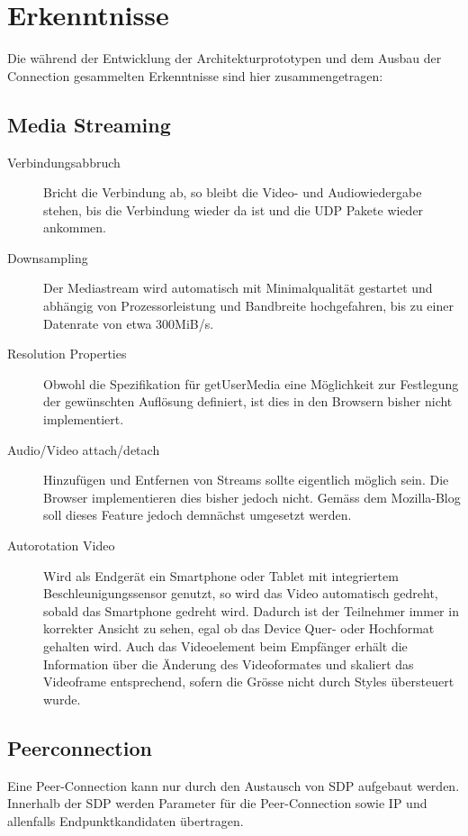 \chapter{Erkenntnisse}
	Die während der Entwicklung der Architekturprototypen und dem Ausbau der Connection gesammelten Erkenntnisse sind hier zusammengetragen:

	\section{Media Streaming}
		\begin{description}
			\item[Verbindungsabbruch] Bricht die Verbindung ab, so bleibt die Video- und Audiowiedergabe stehen, bis die Verbindung wieder da ist und die UDP Pakete wieder ankommen.
		
			\item[Downsampling] Der Mediastream wird automatisch mit Minimalqualität gestartet und abhängig
	 		von Prozessorleistung und Bandbreite hochgefahren, bis zu einer Datenrate von etwa 300MiB/s.
	 		
	 		\item[Resolution Properties] Obwohl die Spezifikation für getUserMedia eine Möglichkeit zur Festlegung der gewünschten Auflösung definiert, ist dies in den Browsern bisher nicht implementiert.
	 		
	 		\item[Audio/Video attach/detach] Hinzufügen und Entfernen von Streams sollte eigentlich möglich sein. Die
	 		Browser implementieren dies bisher jedoch nicht. Gemäss dem Mozilla-Blog soll dieses Feature jedoch demnächst umgesetzt werden.
	 		
	 		\item[Autorotation Video] Wird als Endgerät ein Smartphone oder Tablet mit integriertem Beschleunigungssensor genutzt, so wird das Video automatisch gedreht, sobald das Smartphone gedreht wird. Dadurch ist der Teilnehmer immer in korrekter Ansicht zu sehen, egal ob das Device Quer- oder Hochformat gehalten wird.
	 		Auch das Videoelement beim Empfänger erhält die Information über die Änderung des Videoformates und skaliert das Videoframe entsprechend, sofern die Grösse nicht durch Styles übersteuert wurde.
	 	\end{description}
	 	
	 \section{Peerconnection}
	 	Eine Peer-Connection kann nur durch den Austausch von SDP aufgebaut werden. Innerhalb der SDP werden Parameter für die Peer-Connection
	 	sowie IP und allenfalls Endpunktkandidaten übertragen.
	 	
